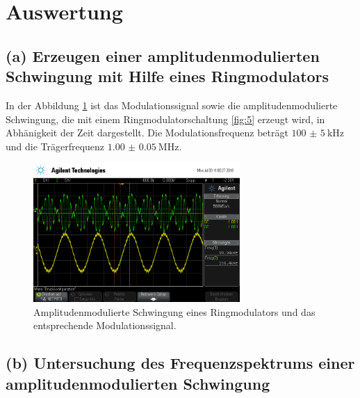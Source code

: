 \section{Auswertung}
\label{sec:Auswertung}


\subsection{(a) Erzeugen einer amplitudenmodulierten Schwingung mit
Hilfe eines Ringmodulators}
\label{subsec:auswertung_a}
In der Abbildung \ref{fig:ringamp_zeit} ist das Modulationssignal
sowie die amplitudenmodulierte Schwingung, die mit einem Ringmodulatorschaltung \ref{fig:5}
erzeugt wird,
in Abhänigkeit der Zeit dargestellt.
Die Modulationsfrequenz beträgt $\SI{100(5)}{\kilo\hertz}$
und die Trägerfrequenz $\SI{1.00(5)}{\mega\hertz}$.
\begin{figure}
  \centering
  \includegraphics[width=0.7\textwidth]{osci/amp_ringmodulator.png}
  \caption{Amplitudenmodulierte
  Schwingung eines Ringmodulators und das entsprechende Modulationssignal.}
  \label{fig:ringamp_zeit}
\end{figure}


\subsection{(b) Untersuchung des Frequenzspektrums einer
amplitudenmodulierten Schwingung}
\label{subsec:auswertung_b}

